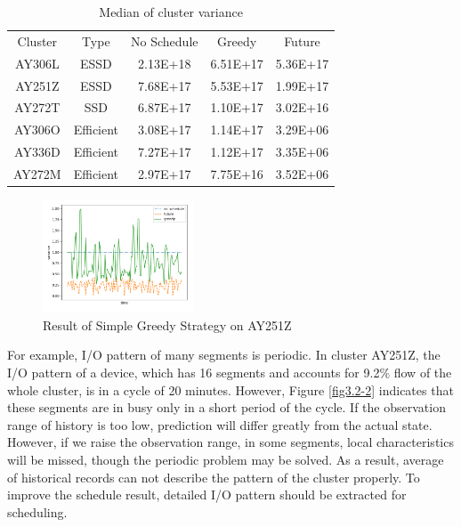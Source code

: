 \begin{table}[ht]
    \footnotesize
    \centering
    \begin{tabular}{c|c|c|c|c}
         Cluster & Type& No Schedule & Greedy & Future\\
         AY306L & ESSD & 2.13E+18 & 6.51E+17 & 5.36E+17\\
         AY251Z & ESSD & 7.68E+17 & 5.53E+17 & 1.99E+17\\
         AY272T & SSD & 6.87E+17 & 1.10E+17 & 3.02E+16\\
         AY306O & Efficient & 3.08E+17 & 1.14E+17 & 3.29E+06\\
         AY336D & Efficient & 7.27E+17 & 1.12E+17 & 3.35E+06\\
         AY272M & Efficient & 2.97E+17 & 7.75E+16 & 3.52E+06\\
    \end{tabular}
    \caption{Median of cluster variance}
    \label{table3.2-1}
\end{table}

\begin{figure}[ht]
    \centering
    \includegraphics[width=0.4\textwidth]{Figure-3.2/Figure_1-1.png}
    \caption{Result of Simple Greedy Strategy on AY251Z}
    \label{fig3.2-1}
\end{figure}

For example, I/O pattern of many segments is periodic. In cluster AY251Z, the I/O pattern of a device, which has 16 segments and accounts for 9.2\% flow of the whole cluster, is in a cycle of 20 minutes. However, Figure \ref{fig3.2-2} indicates that these segments are in busy only in a short period of the cycle. If the observation range of history is too low, prediction will differ greatly from the actual state. However, if we raise the observation range, in some segments, local characteristics will be missed, though the periodic problem may be solved. As a result, average of historical records can not describe the pattern of the cluster properly. To improve the schedule result, detailed I/O pattern should be extracted for scheduling.



